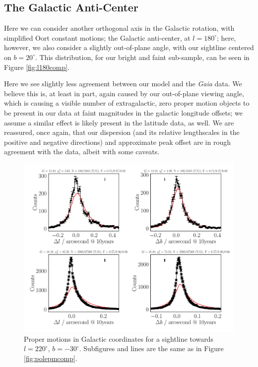\documentclass[fleqn,usenatbib]{mnras}
\begin{document}
\subsection{The Galactic Anti-Center}
Here we can consider another orthogonal axis in the Galactic rotation, with simplified Oort constant motions; the Galactic anti-center, at $l=180^\circ$; here, however, we also consider a slightly out-of-plane angle, with our sightline centered on $b = 20^\circ$. This distribution, for our bright and faint sub-sample, can be seen in Figure \ref{fig:l180comp}.

Here we see slightly less agreement between our model and the \textit{Gaia} data. We believe this is, at least in part, again caused by our out-of-plane viewing angle, which is causing a visible number of extragalactic, zero proper motion objects to be present in our data at faint magnitudes in the galactic longitude offsets; we assume a similar effect is likely present in the latitude data, as well. We are reassured, once again, that our dispersion (and its relative lengthscales in the positive and negative directions) and approximate peak offset are in rough agreement with the data, albeit with some caveats.
\begin{figure}
    \centering
    \includegraphics[width=\columnwidth]{Plots/plots_pm_gaia_220_-30.pdf}
    \caption{Proper motions in Galactic coordinates for a sightline towards $l = 220^\circ$, $b = -30^\circ$. Subfigures and lines are the same as in Figure \ref{fig:polepmcomp}.}
    \label{fig:l220comp}
\end{figure}
\end{document}
